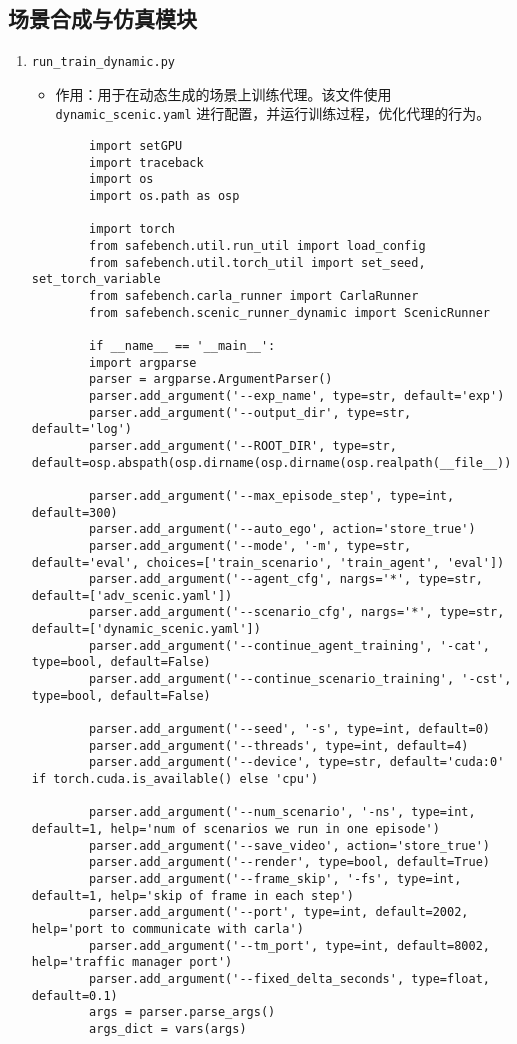 \subsection*{场景合成与仿真模块}
\begin{enumerate}
	\item \texttt{run\_train\_dynamic.py}
	\begin{itemize}
		\item 作用：用于在动态生成的场景上训练代理。该文件使用 \texttt{dynamic\_scenic.yaml} 进行配置，并运行训练过程，优化代理的行为。
	\end{itemize}
	\begin{verbatim}
		import setGPU
		import traceback
		import os
		import os.path as osp
		
		import torch 
		from safebench.util.run_util import load_config
		from safebench.util.torch_util import set_seed, set_torch_variable
		from safebench.carla_runner import CarlaRunner
		from safebench.scenic_runner_dynamic import ScenicRunner
		
		if __name__ == '__main__':
		import argparse
		parser = argparse.ArgumentParser()
		parser.add_argument('--exp_name', type=str, default='exp')
		parser.add_argument('--output_dir', type=str, default='log')
		parser.add_argument('--ROOT_DIR', type=str, default=osp.abspath(osp.dirname(osp.dirname(osp.realpath(__file__)))))
		
		parser.add_argument('--max_episode_step', type=int, default=300)
		parser.add_argument('--auto_ego', action='store_true')
		parser.add_argument('--mode', '-m', type=str, default='eval', choices=['train_scenario', 'train_agent', 'eval'])
		parser.add_argument('--agent_cfg', nargs='*', type=str, default=['adv_scenic.yaml'])
		parser.add_argument('--scenario_cfg', nargs='*', type=str, default=['dynamic_scenic.yaml'])
		parser.add_argument('--continue_agent_training', '-cat', type=bool, default=False)
		parser.add_argument('--continue_scenario_training', '-cst', type=bool, default=False)
		
		parser.add_argument('--seed', '-s', type=int, default=0)
		parser.add_argument('--threads', type=int, default=4)
		parser.add_argument('--device', type=str, default='cuda:0' if torch.cuda.is_available() else 'cpu')   
		
		parser.add_argument('--num_scenario', '-ns', type=int, default=1, help='num of scenarios we run in one episode')
		parser.add_argument('--save_video', action='store_true')
		parser.add_argument('--render', type=bool, default=True)
		parser.add_argument('--frame_skip', '-fs', type=int, default=1, help='skip of frame in each step')
		parser.add_argument('--port', type=int, default=2002, help='port to communicate with carla')
		parser.add_argument('--tm_port', type=int, default=8002, help='traffic manager port')
		parser.add_argument('--fixed_delta_seconds', type=float, default=0.1)
		args = parser.parse_args()
		args_dict = vars(args)
		

\end{verbatim}
\end{enumerate}
